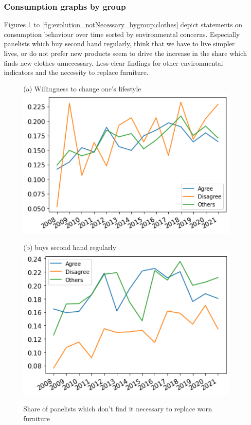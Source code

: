 \documentclass[12pt]{article}
\begin{document}
\subsubsection{Consumption graphs by group}
Figures
\ref{fig:evolution_notNecessary_bygroup:furniture} to \ref{fig:evolution_notNecessary_bygroup:clothes} depict statements on consumption behaviour over time sorted by environmental concerns. Especially panelists which buy second hand regularly, think that we have to live simpler lives, or do not prefer new products seem to drive the increase in the share which finds new clothes unnecessary. Less clear findings for other environmental indicators and the necessity to replace furniture. 

\begin{figure}[h!!]
	\centering	
	\caption{Share of panelists which don't find it necessary to replace worn furniture }\label{fig:evolution_notNecessary_bygroup:furniture}	
	\begin{minipage}[h!!]{0.32\textwidth}  
		\centering\footnotesize{(a) Willingness to change one's lifestyle}
		\includegraphics[width=1\textwidth]{../codding_data/results/liss/broad_groups_notnecessaryqk20a175_ci307.png}
	\end{minipage}
	\begin{minipage}[h!!]{0.32\textwidth}  
	\centering\footnotesize{(b) buys second hand regularly}
	\includegraphics[width=1\textwidth]{../codding_data/results/liss/broad_groups_notnecessaryqk20a135_ci307.png}

\end{minipage}
\end{figure}
\end{document}
